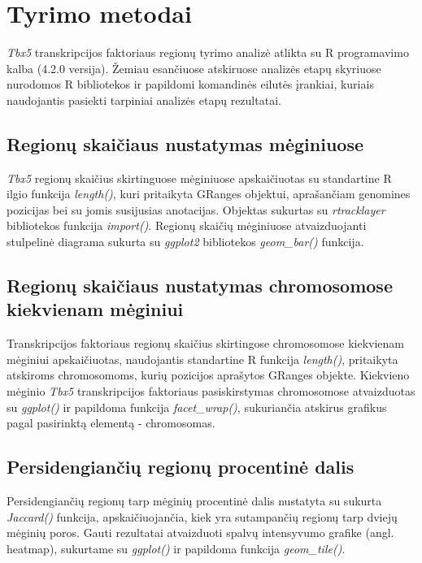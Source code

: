 \documentclass[12pt]{article}
\begin{document}

\section{Tyrimo metodai}
\emph{Tbx5} transkripcijos faktoriaus regionų tyrimo analizė atlikta
su R programavimo kalba (4.2.0 versija). Žemiau esančiuose atskiruose
analizės etapų skyriuose nurodomos R bibliotekos ir papildomi komandinės
eilutės įrankiai, kuriais naudojantis pasiekti tarpiniai analizės etapų
rezultatai.

\subsection{Regionų skaičiaus nustatymas mėginiuose}
\emph{Tbx5} regionų skaičius skirtinguose mėginiuose apskaičiuotas
su standartine R ilgio funkcija \emph{length()}, kuri pritaikyta
GRanges objektui, aprašančiam genomines pozicijas bei su jomis
susijusias anotacijas. Objektas sukurtas su \emph{rtracklayer}
bibliotekos funkcija \emph{import()}.
Regionų skaičių mėginiuose atvaizduojanti stulpelinė diagrama
sukurta su \emph{ggplot2} bibliotekos \emph{geom\_bar()} funkcija.

\subsection{Regionų skaičiaus nustatymas chromosomose kiekvienam mėginiui}
Transkripcijos faktoriaus regionų skaičius skirtingose chromosomose
kiekvienam mėginiui apskaičiuotas, naudojantis standartine R
funkcija \emph{length()}, pritaikyta atskiroms chromosomoms,
kurių pozicijos aprašytos GRanges objekte.
Kiekvieno mėginio \emph{Tbx5} transkripcijos faktoriaus pasiskirstymas
chromosomose atvaizduotas su \emph{ggplot()} ir papildoma funkcija
\emph{facet\_wrap()}, sukuriančia atskirus grafikus pagal pasirinktą
elementą - chromosomas.

\subsection{Persidengiančių regionų procentinė dalis}
Persidengiančių regionų tarp mėginių procentinė dalis nustatyta
su sukurta \emph{Jaccard()} funkcija, apskaičiuojančia, kiek yra
sutampančių regionų tarp dviejų mėginių poros.
Gauti rezultatai atvaizduoti spalvų intensyvumo grafike (angl.
heatmap), sukurtame su \emph{ggplot()} ir papildoma funkcija
\emph{geom\_tile()}.
\end{document}
